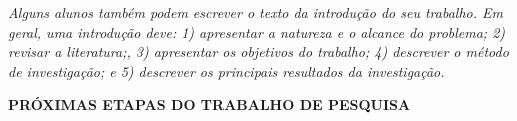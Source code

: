 \documentclass[12pt,a4paper]{article}
\begin{document}
\bigskip

{\itshape
Alguns alunos também podem escrever o texto da introdução do seu trabalho. Em
geral, uma introdução deve: 1) apresentar a natureza e o alcance do problema;
2) revisar a literatura;, 3) apresentar os objetivos do trabalho; 4) descrever
o método de investigação; e 5) descrever os principais resultados da
investigação.}



\newpage

\begin{center}
\textbf{\large PRÓXIMAS ETAPAS DO TRABALHO DE PESQUISA}
\end{center}

\vspace{0.5cm}
\end{document}
